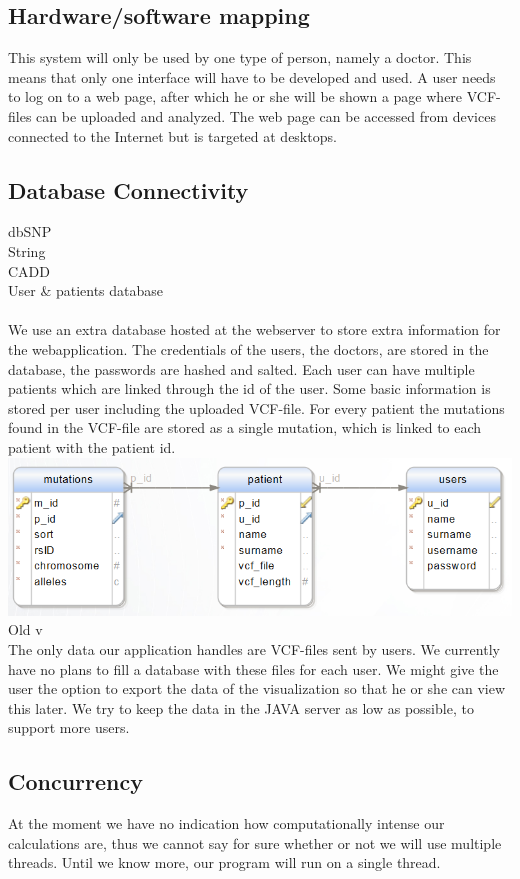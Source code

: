 	\subsection{Hardware/software mapping}
		This system will only be used by one type of person, namely a doctor. This means that only one interface will have to be developed and used. A user needs to log on to a web page, after which he or she will be shown a page where VCF-files can be uploaded and analyzed. The web page can be accessed from devices connected to the Internet but is targeted at desktops.
	\subsection{Database Connectivity}
		dbSNP\\
		String\\
		CADD\\
		User \& patients database\\\\
		We use an extra database hosted at the webserver to store extra information for the webapplication. 
		The credentials of the users, the doctors, are stored in the database, the passwords are hashed and salted.
		Each user can have multiple patients which are linked through the id of the user.
		Some basic information is stored per user including the uploaded VCF-file.
		For every patient the mutations found in the VCF-file are stored as a single mutation, which is linked to each patient with the patient id.
		\includegraphics[scale=0.5]{erd.png}
		Old v\\
		The only data our application handles are VCF-files sent by users. We currently have no plans to fill a database with these files for each user. We might give the user the option to export the data of the visualization so that he or she can view this later. We try to keep the data in the JAVA server as low as possible, to support more users.
	\subsection{Concurrency }
		At the moment we have no indication how computationally intense our calculations are, thus we cannot say for sure whether or not we will use multiple threads. Until we know more, our program will run on a single thread.
		
